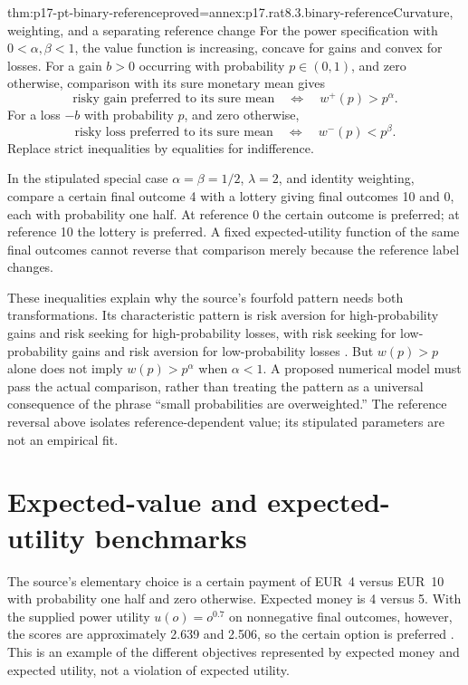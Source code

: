 \begin{hbtheorem}{thm:p17-pt-binary-reference}{proved=annex:p17.rat8.3.binary-reference}{Curvature, weighting, and a separating reference change}
For the power specification with \(0<\alpha,\beta<1\), the value
function is increasing, concave for gains and convex for losses.
For a gain \(b>0\) occurring with probability \(p\in(0,1)\), and
zero otherwise, comparison with its sure monetary mean gives
\[
 \text{risky gain preferred to its sure mean}
 \quad\Longleftrightarrow\quad w^+(p)>p^\alpha.
\]
For a loss \(-b\) with probability \(p\), and zero otherwise,
\[
 \text{risky loss preferred to its sure mean}
 \quad\Longleftrightarrow\quad w^-(p)<p^\beta.
\]
Replace strict inequalities by equalities for indifference.

In the stipulated special case \(\alpha=\beta=1/2\),
\(\lambda=2\), and identity weighting, compare a certain final
outcome 4 with a lottery giving final outcomes 10 and 0, each with
probability one half. At reference 0 the certain outcome is preferred;
at reference 10 the lottery is preferred. A fixed expected-utility
function of the same final outcomes cannot reverse that comparison
merely because the reference label changes.
\end{hbtheorem}

These inequalities explain why the source's fourfold pattern needs
both transformations. Its characteristic pattern is risk aversion for
high-probability gains and risk seeking for high-probability losses,
with risk seeking for low-probability gains and risk aversion for
low-probability losses \cite[note~1, p.~491]{Glockner2021ProspectTheory}.
But \(w(p)>p\) alone does not imply \(w(p)>p^\alpha\) when
\(\alpha<1\). A proposed numerical model must pass the actual
comparison, rather than treating the pattern as a universal consequence
of the phrase ``small probabilities are overweighted.'' The reference
reversal above isolates reference-dependent value; its stipulated
parameters are not an empirical fit.

\section{Expected-value and expected-utility benchmarks}

The source's elementary choice is a certain payment of EUR~4 versus
EUR~10 with probability one half and zero otherwise. Expected money
is 4 versus 5. With the supplied power utility \(u(o)=o^{0.7}\) on
nonnegative final outcomes, however, the scores are approximately
2.639 and 2.506, so the certain option is preferred
\cite[p.~487]{Glockner2021ProspectTheory}. This is an example of
the different objectives represented by expected money and expected
utility, not a violation of expected utility.

